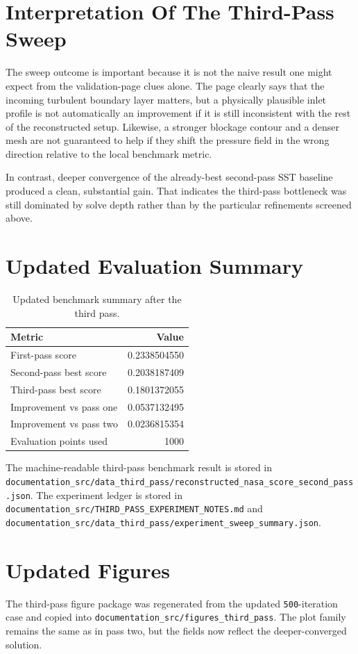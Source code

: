 \documentclass[11pt]{article}
\begin{document}
\section{Interpretation Of The Third-Pass Sweep}
The sweep outcome is important because it is not the naive result one might expect from the validation-page clues alone. The page clearly says that the incoming turbulent boundary layer matters, but a physically plausible inlet profile is not automatically an improvement if it is still inconsistent with the rest of the reconstructed setup. Likewise, a stronger blockage contour and a denser mesh are not guaranteed to help if they shift the pressure field in the wrong direction relative to the local benchmark metric.

In contrast, deeper convergence of the already-best second-pass SST baseline produced a clean, substantial gain. That indicates the third-pass bottleneck was still dominated by solve depth rather than by the particular refinements screened above.

\section{Updated Evaluation Summary}
\begin{table}[H]
\centering
\begin{tabularx}{0.72\linewidth}{>{\raggedright\arraybackslash}X r}
\toprule
Metric & Value \\
\midrule
First-pass score & 0.2338504550 \\
Second-pass best score & 0.2038187409 \\
Third-pass best score & 0.1801372055 \\
Improvement vs pass one & 0.0537132495 \\
Improvement vs pass two & 0.0236815354 \\
Evaluation points used & 1000 \\
\bottomrule
\end{tabularx}
\caption{Updated benchmark summary after the third pass.}
\end{table}

The machine-readable third-pass benchmark result is stored in
\texttt{documentation\_src/data\_third\_pass/reconstructed\_nasa\_score\_second\_pass.json}.
The experiment ledger is stored in
\texttt{documentation\_src/THIRD\_PASS\_EXPERIMENT\_NOTES.md} and
\texttt{documentation\_src/data\_third\_pass/experiment\_sweep\_summary.json}.

\section{Updated Figures}
The third-pass figure package was regenerated from the updated \texttt{500}-iteration case and copied into \texttt{documentation\_src/figures\_third\_pass}. The plot family remains the same as in pass two, but the fields now reflect the deeper-converged solution.
\end{document}
